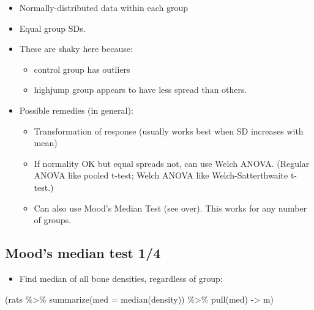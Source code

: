 \documentclass[
  letterpaper,
  DIV=11,
  numbers=noendperiod]{scrartcl}
\newenvironment{Shaded}{\begin{snugshade}}{\end{snugshade}}
\newcommand{\AttributeTok}[1]{\textcolor[rgb]{0.40,0.45,0.13}{#1}}
\newcommand{\FunctionTok}[1]{\textcolor[rgb]{0.28,0.35,0.67}{#1}}
\newcommand{\NormalTok}[1]{\textcolor[rgb]{0.00,0.23,0.31}{#1}}
\newcommand{\OtherTok}[1]{\textcolor[rgb]{0.00,0.23,0.31}{#1}}
\newcommand{\SpecialCharTok}[1]{\textcolor[rgb]{0.37,0.37,0.37}{#1}}
\providecommand{\tightlist}{%
  \setlength{\itemsep}{0pt}\setlength{\parskip}{0pt}}\usepackage{longtable,booktabs,array}
\begin{document}
\begin{itemize}
\tightlist
\item
  Normally-distributed data within each group
\item
  Equal group SDs.
\item
  These are shaky here because:

  \begin{itemize}
  \tightlist
  \item
    control group has outliers
  \item
    highjump group appears to have less spread than others.
  \end{itemize}
\item
  Possible remedies (in general):

  \begin{itemize}
  \tightlist
  \item
    Transformation of response (usually works best when SD increases
    with mean)
  \item
    If normality OK but equal spreads not, can use Welch ANOVA. (Regular
    ANOVA like pooled t-test; Welch ANOVA like Welch-Satterthwaite
    t-test.)
  \item
    Can also use Mood's Median Test (see over). This works for any
    number of groups.
  \end{itemize}
\end{itemize}

\hypertarget{moods-median-test-14}{%
\subsection{Mood's median test 1/4}\label{moods-median-test-14}}

\begin{itemize}
\tightlist
\item
  Find median of all bone densities, regardless of group:
\end{itemize}

\small

\begin{Shaded}
\begin{Highlighting}[]
\NormalTok{(rats }\SpecialCharTok{\%\textgreater{}\%} \FunctionTok{summarize}\NormalTok{(}\AttributeTok{med =} \FunctionTok{median}\NormalTok{(density)) }\SpecialCharTok{\%\textgreater{}\%} \FunctionTok{pull}\NormalTok{(med) }\OtherTok{{-}\textgreater{}}\NormalTok{ m)}
\end{Highlighting}
\end{Shaded}
\end{document}
